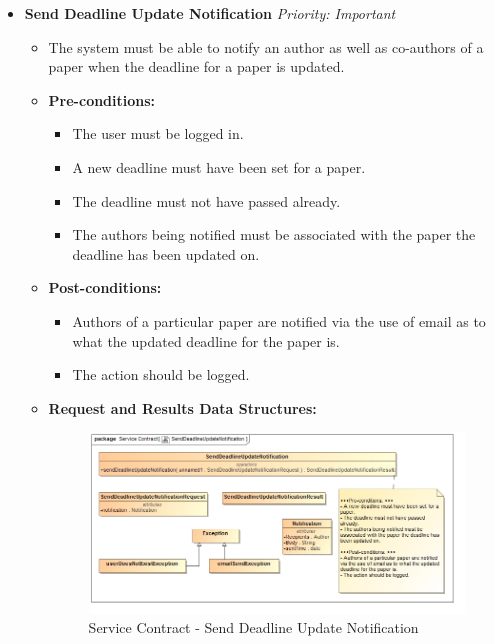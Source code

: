 \documentclass{article}
\begin{document}
\begin{itemize}
					\item \textbf{Send Deadline Update Notification} \hfill \textit{Priority: Important}
					\begin{itemize}
						\item The system must be able to notify an author as well as co-authors of a paper when the deadline for a paper is updated.
						\item \textbf{Pre-conditions:}
						\begin{itemize}
							\item The user must be logged in.
							\item A new deadline must have been set for a paper.
							\item The deadline must not have passed already.
							\item The authors being notified must be associated with the paper the deadline has been updated on.
						\end{itemize}
						\item \textbf{Post-conditions:}
						\begin{itemize}
							\item Authors of a particular paper are notified via the use of email as to what the updated deadline for the paper is.
							\item The action should be logged.
						\end{itemize}
						\item \textbf{Request and Results Data Structures:}
						\begin{figure}[H]
							\includegraphics[width=\linewidth]{../Diagrams/ServiceContracts/Notification subsystem/SendDeadlineUpdateNotification.jpg}
							\caption{Service Contract - Send Deadline Update Notification}
						\end{figure}
					\end{itemize}						
				\end{itemize}
				
\end{document}
